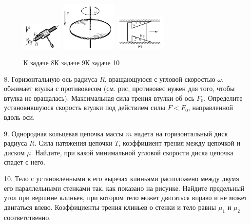 \documentclass[14pt]{article}
\begin{document}
\begin{figure}[h]
\begin{center}
\includegraphics[width=0.18\textwidth]{friction4.png}
\hspace{1cm}
\includegraphics[width=0.25\textwidth]{friction5.png}
\hspace{1cm}
\includegraphics[width=0.23\textwidth]{friction6.png}
\caption{\hspace{-0.3cm}К задаче 8\hspace{3.2cm}К задаче 9\hspace{3.5cm}К задаче 10}
\end{center}
\end{figure}

8. Горизонтальную ось радиуса $R$, вращающуюся с угловой скоростью $\omega$, обжимает втулка с противовесом (см. рис, противовес нужен для того, чтобы втулка не вращалась). Максимальная сила трения втулки об ось $F_0$. Определите установившуюся скорость втулки под действием силы $F<F_0$, направленной вдоль оси.

9. Однородная кольцевая цепочка массы $m$ надета на горизонтальный диск радиуса $R$. Сила натяжения цепочки $T$, коэффициент трения между цепочкой и диском $\mu$. Найдите, при какой минимальной угловой скорости диска цепочка спадет с него.

10. Тело с установленными в его вырезах клиньями расположено между двумя его параллельными стенками так, как показано на рисунке. Найдите предельный угол при вершине клиньев, при котором тело может двигаться вправо и не может двигаться влево. Коэффициенты трения клиньев о стенки и тело равны $\mu_1$ и $\mu_2$ соответственно.
\end{document}
